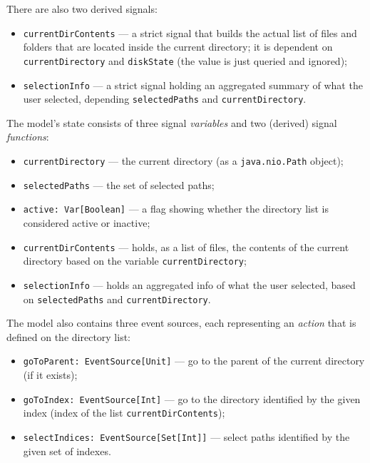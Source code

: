 There are also two derived signals:
\begin{itemize}

\item \texttt{currentDirContents} --- a strict signal that builds the actual list of files and folders that are located inside the current directory; it is dependent on \texttt{currentDirectory} and \texttt{diskState} (the value is just queried and ignored);

\item \texttt{selectionInfo} --- a strict signal holding an aggregated summary of what the user selected, depending \texttt{selectedPaths} and \texttt{currentDirectory}.
\end{itemize}



The model's state consists of three signal \emph{variables} and two (derived) signal \emph{functions}:
\begin{itemize}
\item \texttt{currentDirectory} --- the current directory (as a \texttt{java.nio.Path} object);
\item \texttt{selectedPaths} --- the set of selected paths;
\item \texttt{active: Var[Boolean]} --- a flag showing whether the directory list is considered active or inactive;
\item \texttt{currentDirContents} --- holds, as a list of files, the contents of the current directory based on the variable  \texttt{currentDirectory};
\item \texttt{selectionInfo} --- holds an aggregated info of what the user selected, based on \texttt{selectedPaths} and \texttt{currentDirectory}.
\end{itemize}

The model also contains three event sources, each representing an \emph{action} that is defined on the directory list:
\begin{itemize}
\item \texttt{goToParent: EventSource[Unit]} --- go to the parent of the current directory (if it exists);
\item \texttt{goToIndex: EventSource[Int]} --- go to the directory identified by the given index (index of the list \texttt{currentDirContents});
\item \texttt{selectIndices: EventSource[Set[Int]]} --- select paths identified by the given set of indexes.
\end{itemize}

